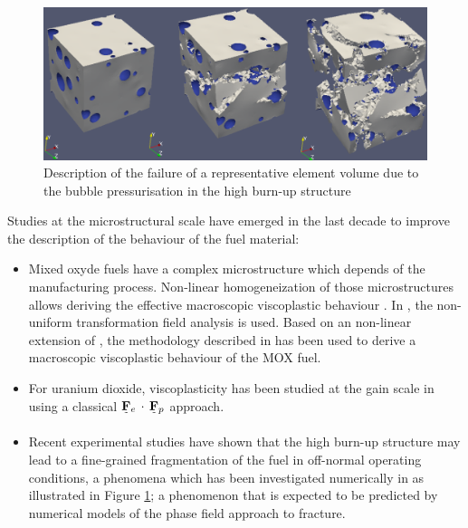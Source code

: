 
\begin{figure}[H]
  \centering
  \includegraphics[width=10.cm]{../chapter_00_introduction/figures/VEREsnoul.png}
  \caption{Description of the failure of a representative element volume due to
  the bubble pressurisation in the high burn-up structure
  \cite{esnoul_etude_2018}}
  \label{fig:hho:esnoul}
\end{figure}

Studies at the microstructural scale have emerged in the last decade to
improve the description of the behaviour of the fuel material:

\begin{itemize}
  \item Mixed oxyde fuels have a complex microstructure which depends of the
  manufacturing process. Non-linear homogeneization of those
  microstructures allows deriving the effective macroscopic viscoplastic
  behaviour \cite{el_abdi_generation_2018}. In
  \cite{roussette_analyse_2005, largenton_modelisation_2012, largenton_extension_2019},
  the non-uniform transformation field analysis is used. Based on an
  non-linear extension of \cite{ricaud_effective_2009}, the methodology
  described in \cite{masson_modified_2020} has been used to derive a
  macroscopic viscoplastic behaviour of the MOX fuel.
  \item For uranium dioxide, viscoplasticity has been
  studied at the gain scale in \cite{portelette_crystal_2018} using a
  classical \({\underset{\tilde{}}{\mathbf{F}}}{}_{e}\,\cdot\,{\underset{\tilde{}}{\mathbf{F}}}{}_{p}\) approach.
  \item Recent experimental studies have shown that the high burn-up structure
  may lead to a fine-grained fragmentation of the fuel in off-normal
  operating conditions, a phenomena which has been investigated
  numerically in \cite{esnoul_etude_2018} as illustrated in Figure
  \ref{fig:hho:esnoul}; a phenomenon that is expected to be predicted by numerical models of the phase field 
  approach to fracture.
\end{itemize}

